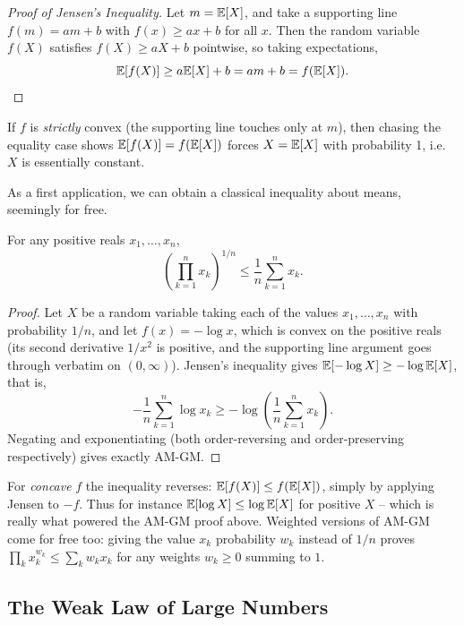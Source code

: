 \documentclass[a4paper]{scrartcl}
\begin{document}
\begin{proof}[Proof of Jensen's Inequality]
	Let $m = \mathbb{E}[X]$, and take a supporting line $f(m) = am + b$ with $f(x) \geq ax + b$ for all $x$. Then the random variable $f(X)$ satisfies $f(X) \geq aX + b$ pointwise, so taking expectations,
	$$
	\mathbb{E}[f(X)] \geq a\mathbb{E}[X] + b = am + b = f(\mathbb{E}[X]). \qedhere
	$$
\end{proof}

\begin{remark}
	If $f$ is \emph{strictly} convex (the supporting line touches only at $m$), then chasing the equality case shows $\mathbb{E}[f(X)] = f(\mathbb{E}[X])$ forces $X = \mathbb{E}[X]$ with probability 1, i.e.\ $X$ is essentially constant.
\end{remark}

As a first application, we can obtain a classical inequality about means, seemingly for free.

\begin{corollary}[AM-GM Inequality]
	For any positive reals $x_1, \dots, x_n$,
	$$
	\left(\prod_{k = 1}^{n} x_k\right)^{1/n} \leq \frac{1}{n}\sum_{k = 1}^{n} x_k.
	$$
\end{corollary}
\begin{proof}
	Let $X$ be a random variable taking each of the values $x_1, \dots, x_n$ with probability $1/n$, and let $f(x) = -\log x$, which is convex on the positive reals (its second derivative $1/x^2$ is positive, and the supporting line argument goes through verbatim on $(0,\infty)$). Jensen's inequality gives $\mathbb{E}[-\log X] \geq -\log \mathbb{E}[X]$, that is,
	$$
	-\frac{1}{n}\sum_{k=1}^n \log x_k \geq -\log\left(\frac{1}{n}\sum_{k=1}^n x_k\right).
	$$
	Negating and exponentiating (both order-reversing and order-preserving respectively) gives exactly AM-GM.
\end{proof}

\begin{remark}
	For \emph{concave} $f$ the inequality reverses: $\mathbb{E}[f(X)] \leq f(\mathbb{E}[X])$, simply by applying Jensen to $-f$. Thus for instance $\mathbb{E}[\log X] \leq \log \mathbb{E}[X]$ for positive $X$ -- which is really what powered the AM-GM proof above. Weighted versions of AM-GM come for free too: giving the value $x_k$ probability $w_k$ instead of $1/n$ proves $\prod_k x_k^{w_k} \leq \sum_k w_k x_k$ for any weights $w_k \geq 0$ summing to $1$.
\end{remark}

\subsection{The Weak Law of Large Numbers}
\end{document}
